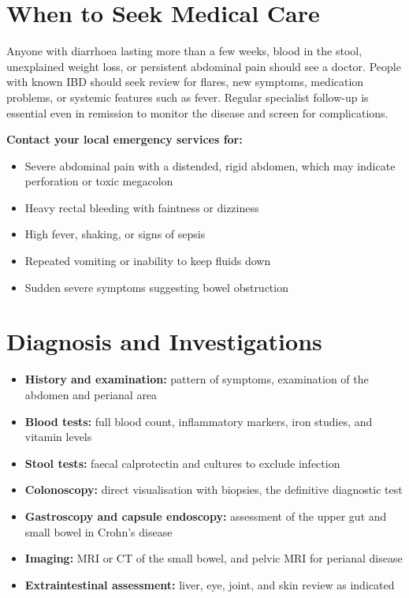 \section*{When to Seek Medical Care}
Anyone with diarrhoea lasting more than a few weeks, blood in the stool, unexplained weight loss, or persistent abdominal pain should see a doctor. People with known IBD should seek review for flares, new symptoms, medication problems, or systemic features such as fever. Regular specialist follow-up is essential even in remission to monitor the disease and screen for complications.

\textbf{Contact your local emergency services for:}
\begin{itemize}
    \item Severe abdominal pain with a distended, rigid abdomen, which may indicate perforation or toxic megacolon
    \item Heavy rectal bleeding with faintness or dizziness
    \item High fever, shaking, or signs of sepsis
    \item Repeated vomiting or inability to keep fluids down
    \item Sudden severe symptoms suggesting bowel obstruction
\end{itemize}

\section*{Diagnosis and Investigations}
\begin{itemize}
    \item \textbf{History and examination:} pattern of symptoms, examination of the abdomen and perianal area
    \item \textbf{Blood tests:} full blood count, inflammatory markers, iron studies, and vitamin levels
    \item \textbf{Stool tests:} faecal calprotectin and cultures to exclude infection
    \item \textbf{Colonoscopy:} direct visualisation with biopsies, the definitive diagnostic test
    \item \textbf{Gastroscopy and capsule endoscopy:} assessment of the upper gut and small bowel in Crohn's disease
    \item \textbf{Imaging:} MRI or CT of the small bowel, and pelvic MRI for perianal disease
    \item \textbf{Extraintestinal assessment:} liver, eye, joint, and skin review as indicated
\end{itemize}

